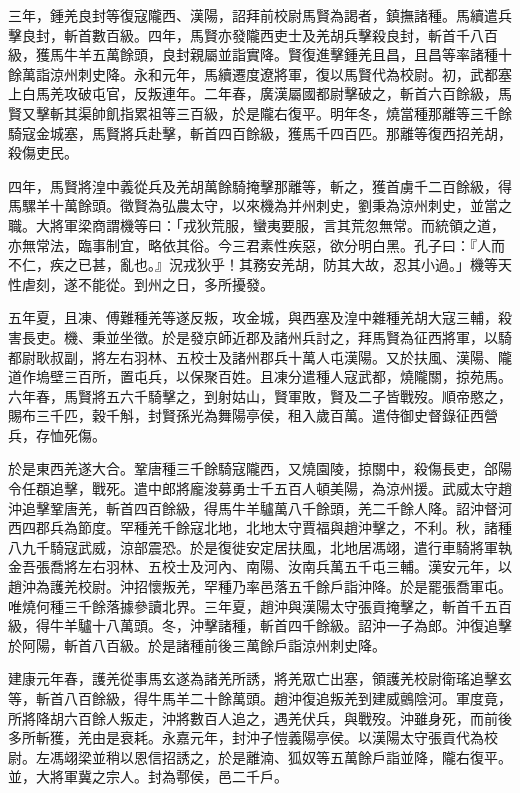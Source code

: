 \begin{pinyinscope}
三年，鍾羌良封等復寇隴西、漢陽，詔拜前校尉馬賢為謁者，鎮撫諸種。馬續遣兵擊良封，斬首數百級。四年，馬賢亦發隴西吏士及羌胡兵擊殺良封，斬首千八百級，獲馬牛羊五萬餘頭，良封親屬並詣實降。賢復進擊鍾羌且昌，且昌等率諸種十餘萬詣涼州刺史降。永和元年，馬續遷度遼將軍，復以馬賢代為校尉。初，武都塞上白馬羌攻破屯官，反叛連年。二年春，廣漢屬國都尉擊破之，斬首六百餘級，馬賢又擊斬其渠帥飢指累祖等三百級，於是隴右復平。明年冬，燒當種那離等三千餘騎寇金城塞，馬賢將兵赴擊，斬首四百餘級，獲馬千四百匹。那離等復西招羌胡，殺傷吏民。

四年，馬賢將湟中義從兵及羌胡萬餘騎掩擊那離等，斬之，獲首虜千二百餘級，得馬騾羊十萬餘頭。徵賢為弘農太守，以來機為并州刺史，劉秉為涼州刺史，並當之職。大將軍梁商謂機等曰：「戎狄荒服，蠻夷要服，言其荒忽無常。而統領之道，亦無常法，臨事制宜，略依其俗。今三君素性疾惡，欲分明白黑。孔子曰：『人而不仁，疾之已甚，亂也。』況戎狄乎！其務安羌胡，防其大故，忍其小過。」機等天性虐刻，遂不能從。到州之日，多所擾發。

五年夏，且凍、傅難種羌等遂反叛，攻金城，與西塞及湟中雜種羌胡大寇三輔，殺害長吏。機、秉並坐徵。於是發京師近郡及諸州兵討之，拜馬賢為征西將軍，以騎都尉耿叔副，將左右羽林、五校士及諸州郡兵十萬人屯漢陽。又於扶風、漢陽、隴道作塢壁三百所，置屯兵，以保聚百姓。且凍分遣種人寇武都，燒隴關，掠苑馬。六年春，馬賢將五六千騎擊之，到射姑山，賢軍敗，賢及二子皆戰歿。順帝愍之，賜布三千匹，穀千斛，封賢孫光為舞陽亭侯，租入歲百萬。遣侍御史督錄征西營兵，存恤死傷。

於是東西羌遂大合。鞏唐種三千餘騎寇隴西，又燒園陵，掠關中，殺傷長吏，郃陽令任頵追擊，戰死。遣中郎將龐浚募勇士千五百人頓美陽，為涼州援。武威太守趙沖追擊鞏唐羌，斬首四百餘級，得馬牛羊驢萬八千餘頭，羌二千餘人降。詔沖督河西四郡兵為節度。罕種羌千餘寇北地，北地太守賈福與趙沖擊之，不利。秋，諸種八九千騎寇武威，涼部震恐。於是復徙安定居扶風，北地居馮翊，遣行車騎將軍執金吾張喬將左右羽林、五校士及河內、南陽、汝南兵萬五千屯三輔。漢安元年，以趙沖為護羌校尉。沖招懷叛羌，罕種乃率邑落五千餘戶詣沖降。於是罷張喬軍屯。唯燒何種三千餘落據參讀北界。三年夏，趙沖與漢陽太守張貢掩擊之，斬首千五百級，得牛羊驢十八萬頭。冬，沖擊諸種，斬首四千餘級。詔沖一子為郎。沖復追擊於阿陽，斬首八百級。於是諸種前後三萬餘戶詣涼州刺史降。

建康元年春，護羌從事馬玄遂為諸羌所誘，將羌眾亡出塞，領護羌校尉衛瑤追擊玄等，斬首八百餘級，得牛馬羊二十餘萬頭。趙沖復追叛羌到建威鸇陰河。軍度竟，所將降胡六百餘人叛走，沖將數百人追之，遇羌伏兵，與戰歿。沖雖身死，而前後多所斬獲，羌由是衰耗。永嘉元年，封沖子愷義陽亭侯。以漢陽太守張貢代為校尉。左馮翊梁並稍以恩信招誘之，於是離湳、狐奴等五萬餘戶詣並降，隴右復平。並，大將軍冀之宗人。封為鄠侯，邑二千戶。


\end{pinyinscope}

